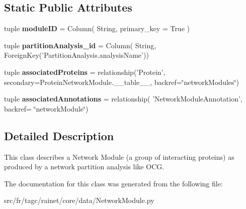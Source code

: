 \subsection*{Static Public Attributes}
\begin{DoxyCompactItemize}
\item 
\hypertarget{classsrc_1_1fr_1_1tagc_1_1rainet_1_1core_1_1data_1_1NetworkModule_1_1NetworkModule_ab06d07b3543741afb05826e3ec611206}{tuple {\bfseries module\-I\-D} = Column( String, primary\-\_\-key = True )}\label{classsrc_1_1fr_1_1tagc_1_1rainet_1_1core_1_1data_1_1NetworkModule_1_1NetworkModule_ab06d07b3543741afb05826e3ec611206}

\item 
\hypertarget{classsrc_1_1fr_1_1tagc_1_1rainet_1_1core_1_1data_1_1NetworkModule_1_1NetworkModule_af105d7d1e7b91a3b779c2bb5ffa8feb6}{tuple {\bfseries partition\-Analysis\-\_\-id} = Column( String, Foreign\-Key('Partition\-Analysis.\-analysis\-Name'))}\label{classsrc_1_1fr_1_1tagc_1_1rainet_1_1core_1_1data_1_1NetworkModule_1_1NetworkModule_af105d7d1e7b91a3b779c2bb5ffa8feb6}

\item 
\hypertarget{classsrc_1_1fr_1_1tagc_1_1rainet_1_1core_1_1data_1_1NetworkModule_1_1NetworkModule_a6a0c59be82d0603a9b7106be205af7ec}{tuple {\bfseries associated\-Proteins} = relationship('Protein', secondary=Protein\-Network\-Module.\-\_\-\-\_\-table\-\_\-\-\_\-, backref=\char`\"{}network\-Modules\char`\"{})}\label{classsrc_1_1fr_1_1tagc_1_1rainet_1_1core_1_1data_1_1NetworkModule_1_1NetworkModule_a6a0c59be82d0603a9b7106be205af7ec}

\item 
\hypertarget{classsrc_1_1fr_1_1tagc_1_1rainet_1_1core_1_1data_1_1NetworkModule_1_1NetworkModule_a956f518c1f903e5625727fb0ac41ace8}{tuple {\bfseries associated\-Annotations} = relationship( 'Network\-Module\-Annotation', backref= \char`\"{}network\-Module\char`\"{})}\label{classsrc_1_1fr_1_1tagc_1_1rainet_1_1core_1_1data_1_1NetworkModule_1_1NetworkModule_a956f518c1f903e5625727fb0ac41ace8}

\end{DoxyCompactItemize}


\subsection{Detailed Description}
This class describes a Network Module (a group of interacting proteins) as produced by a network partition analysis like O\-C\-G. 

The documentation for this class was generated from the following file\-:\begin{DoxyCompactItemize}
\item 
src/fr/tagc/rainet/core/data/Network\-Module.\-py\end{DoxyCompactItemize}
